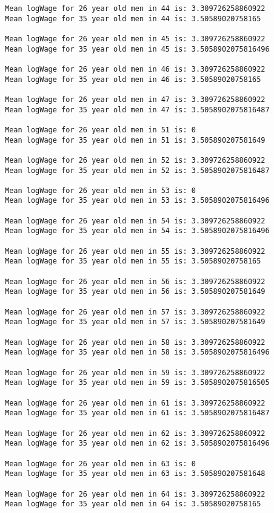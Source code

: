 \documentclass[11pt]{article}
\begin{document}
\begin{Verbatim}[commandchars=\\\{\}]
Mean logWage for 26 year old men in 44 is: 3.309726258860922
Mean logWage for 35 year old men in 44 is: 3.50589020758165

Mean logWage for 26 year old men in 45 is: 3.309726258860922
Mean logWage for 35 year old men in 45 is: 3.5058902075816496

Mean logWage for 26 year old men in 46 is: 3.309726258860922
Mean logWage for 35 year old men in 46 is: 3.50589020758165

Mean logWage for 26 year old men in 47 is: 3.309726258860922
Mean logWage for 35 year old men in 47 is: 3.5058902075816487

Mean logWage for 26 year old men in 51 is: 0
Mean logWage for 35 year old men in 51 is: 3.505890207581649

Mean logWage for 26 year old men in 52 is: 3.309726258860922
Mean logWage for 35 year old men in 52 is: 3.5058902075816487

Mean logWage for 26 year old men in 53 is: 0
Mean logWage for 35 year old men in 53 is: 3.5058902075816496

Mean logWage for 26 year old men in 54 is: 3.309726258860922
Mean logWage for 35 year old men in 54 is: 3.5058902075816496

Mean logWage for 26 year old men in 55 is: 3.309726258860922
Mean logWage for 35 year old men in 55 is: 3.50589020758165

Mean logWage for 26 year old men in 56 is: 3.309726258860922
Mean logWage for 35 year old men in 56 is: 3.505890207581649

Mean logWage for 26 year old men in 57 is: 3.309726258860922
Mean logWage for 35 year old men in 57 is: 3.505890207581649

Mean logWage for 26 year old men in 58 is: 3.309726258860922
Mean logWage for 35 year old men in 58 is: 3.5058902075816496

Mean logWage for 26 year old men in 59 is: 3.309726258860922
Mean logWage for 35 year old men in 59 is: 3.5058902075816505

Mean logWage for 26 year old men in 61 is: 3.309726258860922
Mean logWage for 35 year old men in 61 is: 3.5058902075816487

Mean logWage for 26 year old men in 62 is: 3.309726258860922
Mean logWage for 35 year old men in 62 is: 3.5058902075816496

Mean logWage for 26 year old men in 63 is: 0
Mean logWage for 35 year old men in 63 is: 3.505890207581648

Mean logWage for 26 year old men in 64 is: 3.309726258860922
Mean logWage for 35 year old men in 64 is: 3.50589020758165


\end{Verbatim}
\end{document}
